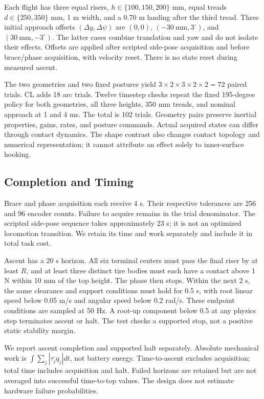 \documentclass[letterpaper,10pt,conference]{ieeeconf}
\begin{document}
Each flight has three equal risers, $h\in\{100,150,200\}$ mm, equal treads $d\in\{250,350\}$ mm, 1 m width, and a 0.70 m landing after the third tread. Three initial approach offsets $(\Delta y,\Delta\psi)$ are $(0,0)$, $(-30\ \mathrm{mm},3^\circ)$, and $(30\ \mathrm{mm},-3^\circ)$. The latter cases combine translation and yaw and do not isolate their effects. Offsets are applied after scripted side-pose acquisition and before brace/phase acquisition, with velocity reset. There is no state reset during measured ascent.

The two geometries and two fixed postures yield $3\times2\times3\times2\times2=72$ paired trials. CL adds 18 arc trials. Twelve timestep checks repeat the fixed 195-degree policy for both geometries, all three heights, 350 mm treads, and nominal approach at 1 and 4 ms. The total is 102 trials. Geometry pairs preserve inertial properties, gains, rates, and posture commands. Actual acquired states can differ through contact dynamics. The shape contrast also changes contact topology and numerical representation; it cannot attribute an effect solely to inner-surface hooking.

\subsection{Completion and Timing}
Brace and phase acquisition each receive 4 s. Their respective tolerances are 256 and 96 encoder counts. Failure to acquire remains in the trial denominator. The scripted side-pose sequence takes approximately 23 s; it is not an optimized locomotion transition. We retain its time and work separately and include it in total task cost.

Ascent has a 20 s horizon. All six terminal centers must pass the final riser by at least $R$, and at least three distinct tire bodies must each have a contact above 1 N within 10 mm of the top height. The phase then stops. Within the next 2 s, the same clearance and support conditions must hold for 0.5 s, with root linear speed below 0.05 m/s and angular speed below 0.2 rad/s. These endpoint conditions are sampled at 50 Hz. A root-up component below 0.5 at any physics step terminates ascent or halt. The test checks a supported stop, not a positive static stability margin.

We report ascent completion and supported halt separately. Absolute mechanical work is $\int\sum_j|\tau_j\dot q_j|dt$, not battery energy. Time-to-ascent excludes acquisition; total time includes acquisition and halt. Failed horizons are retained but are not averaged into successful time-to-top values. The design does not estimate hardware failure probabilities.
\end{document}
